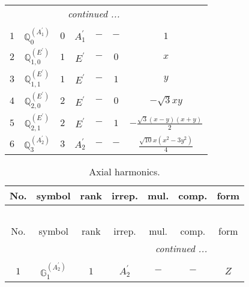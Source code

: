 \documentclass[fleqn,10pt,landscape]{article}
\begin{document}
\begin{itemize}
\begin{center}
\begin{longtable}{ccccccc}
 \hline \hline
\multicolumn{6}{r}{\footnotesize\it continued ...} \\ \endfoot

 \hline \hline
\multicolumn{6}{r}{} \\ \endlastfoot

$ 1 $ & $ \mathbb{Q}_{0}^{(A_{1}^{\prime})} $ & $ 0 $ & $ A_{1}^{\prime} $ & $ - $ & $ - $ & $ 1 $ \\ \hline
$ 2 $ & $ \mathbb{Q}_{1,0}^{(E^{\prime})} $ & $ 1 $ & $ E^{\prime} $ & $ - $ & $ 0 $ & $ x $ \\
$ 3 $ & $ \mathbb{Q}_{1,1}^{(E^{\prime})} $ & $ 1 $ & $ E^{\prime} $ & $ - $ & $ 1 $ & $ y $ \\ \hline
$ 4 $ & $ \mathbb{Q}_{2,0}^{(E^{\prime})} $ & $ 2 $ & $ E^{\prime} $ & $ - $ & $ 0 $ & $ - \sqrt{3} x y $ \\
$ 5 $ & $ \mathbb{Q}_{2,1}^{(E^{\prime})} $ & $ 2 $ & $ E^{\prime} $ & $ - $ & $ 1 $ & $ - \frac{\sqrt{3} \left(x - y\right) \left(x + y\right)}{2} $ \\ \hline
$ 6 $ & $ \mathbb{Q}_{3}^{(A_{2}^{\prime})} $ & $ 3 $ & $ A_{2}^{\prime} $ & $ - $ & $ - $ & $ \frac{\sqrt{10} x \left(x^{2} - 3 y^{2}\right)}{4} $ \\
\end{longtable}
\end{center}
\begin{center}
\renewcommand{\arraystretch}{1.3}
\begin{longtable}{ccccccc}
\caption{Axial harmonics.}
 \\
 \hline \hline
No. & symbol & rank & irrep. & mul. & comp. & form \\ \hline \endfirsthead

\multicolumn{6}{l}{\tablename\ \thetable{}} \\
 \hline \hline
No. & symbol & rank & irrep. & mul. & comp. & form \\ \hline \endhead

 \hline \hline
\multicolumn{6}{r}{\footnotesize\it continued ...} \\ \endfoot

 \hline \hline
\multicolumn{6}{r}{} \\ \endlastfoot

$ 1 $ & $ \mathbb{G}_{1}^{(A_{2}^{\prime})} $ & $ 1 $ & $ A_{2}^{\prime} $ & $ - $ & $ - $ & $ Z $ \\
\end{longtable}
\end{center}


\end{itemize}
\end{document}
